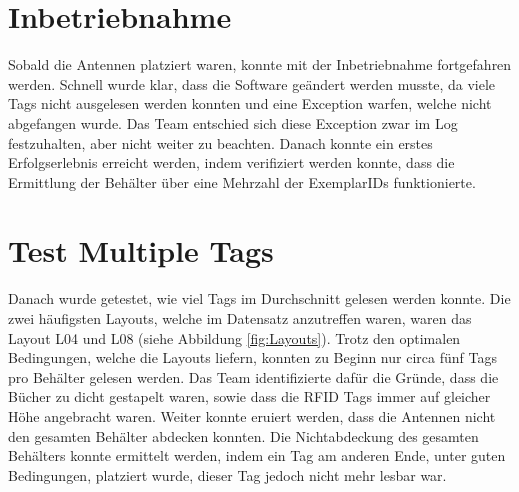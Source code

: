 \documentclass[parskip=full, a4paper]{scrartcl}
\begin{document}
\section{Inbetriebnahme}
Sobald die Antennen platziert waren, konnte mit der Inbetriebnahme fortgefahren werden. Schnell wurde klar, dass die Software geändert werden musste, da viele Tags nicht ausgelesen werden konnten und eine Exception warfen, welche nicht abgefangen wurde. Das Team entschied sich diese Exception zwar im Log festzuhalten, aber nicht weiter zu beachten. Danach konnte ein erstes Erfolgserlebnis erreicht werden, indem verifiziert werden konnte, dass die Ermittlung der Behälter über eine Mehrzahl der ExemplarIDs funktionierte.

\section{Test Multiple Tags}
Danach wurde getestet, wie viel Tags im Durchschnitt gelesen werden konnte. Die zwei häufigsten Layouts, welche im Datensatz anzutreffen waren, waren das Layout L04 und L08 (siehe Abbildung \ref{fig:Layouts}). Trotz den optimalen Bedingungen, welche die Layouts liefern, konnten zu Beginn nur circa fünf Tags pro Behälter gelesen werden. Das Team identifizierte dafür die Gründe, dass die Bücher zu dicht gestapelt waren, sowie dass die RFID Tags immer auf gleicher Höhe angebracht waren. Weiter konnte eruiert werden, dass die Antennen nicht den gesamten Behälter abdecken konnten. Die Nichtabdeckung des gesamten Behälters konnte ermittelt werden, indem ein Tag am anderen Ende, unter guten Bedingungen, platziert wurde, dieser Tag jedoch nicht mehr lesbar war.
\end{document}
